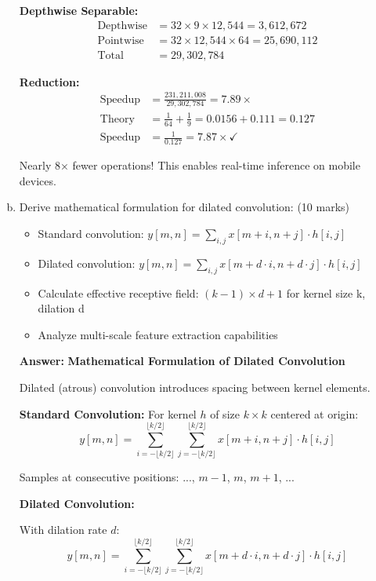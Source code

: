 \documentclass[12pt]{article}
\newcommand{\answer}[1]{{\color{answercolor}\textbf{Answer:} #1}}
\newcommand{\explanation}[1]{{\color{explanationcolor}#1}}
\begin{document}
\begin{enumerate}[(a)]
{{    \textbf{Depthwise Separable:}
    \begin{align}
    \text{Depthwise} &= 32 \times 9 \times 12,544 = 3,612,672\\
    \text{Pointwise} &= 32 \times 12,544 \times 64 = 25,690,112\\
    \text{Total} &= 29,302,784
    \end{align}
    
    \textbf{Reduction:}
    \begin{align}
    \text{Speedup} &= \frac{231,211,008}{29,302,784} = 7.89\times\\
    \text{Theory} &= \frac{1}{64} + \frac{1}{9} = 0.0156 + 0.111 = 0.127\\
    \text{Speedup} &= \frac{1}{0.127} = 7.87\times \checkmark
    \end{align}
    
    Nearly 8× fewer operations! This enables real-time inference on mobile devices.
    }
    }
    
    \item Derive mathematical formulation for dilated convolution: \hfill (10 marks)
    \begin{itemize}
        \item Standard convolution: $y[m,n] = \sum_{i,j} x[m+i, n+j] \cdot h[i,j]$
        \item Dilated convolution: $y[m,n] = \sum_{i,j} x[m+d \cdot i, n+d \cdot j] \cdot h[i,j]$
        \item Calculate effective receptive field: $(k-1) \times d + 1$ for kernel size k, dilation d
        \item Analyze multi-scale feature extraction capabilities
    \end{itemize}
    
    \answer{
    \textbf{Mathematical Formulation of Dilated Convolution}
    
    \explanation{
    Dilated (atrous) convolution introduces spacing between kernel elements.
    
    \textbf{Standard Convolution:}
    For kernel $h$ of size $k \times k$ centered at origin:
    \[y[m,n] = \sum_{i=-\lfloor k/2 \rfloor}^{\lfloor k/2 \rfloor} \sum_{j=-\lfloor k/2 \rfloor}^{\lfloor k/2 \rfloor} x[m+i, n+j] \cdot h[i,j]\]
    
    Samples at consecutive positions: ..., $m-1$, $m$, $m+1$, ...
    }
    
    \textbf{Dilated Convolution:}
    
    \explanation{
    With dilation rate $d$:
    \[y[m,n] = \sum_{i=-\lfloor k/2 \rfloor}^{\lfloor k/2 \rfloor} \sum_{j=-\lfloor k/2 \rfloor}^{\lfloor k/2 \rfloor} x[m+d \cdot i, n+d \cdot j] \cdot h[i,j]\]
    
}}
\end{enumerate}
\end{document}
